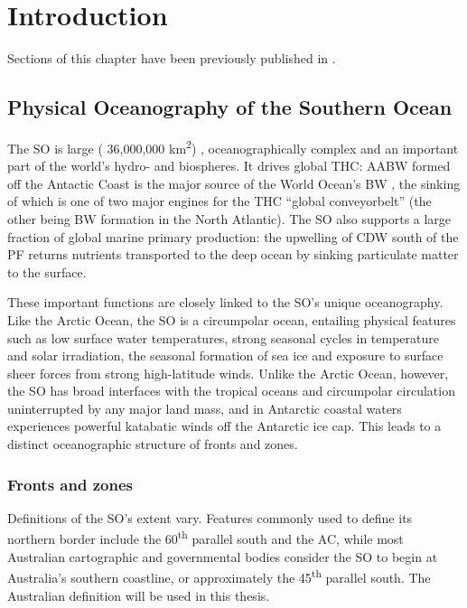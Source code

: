 \chapter{Introduction} 
\label{ch:intro}

Sections of this chapter have been previously published in .

\section{Physical Oceanography of the Southern Ocean}

The \ac{SO} is large (\textapprox{} 36,000,000 km\textsuperscript{2}) \cite{Laws:1985tx}, oceanographically complex and an important part of the world's hydro- and biospheres.
It drives global \ac{THC}: \ac{AABW} formed off the Antactic Coast is the major source of the World Ocean's \ac{BW} \cite{Jacobs:2004hv}, the sinking of which is one of two major engines for the \ac{THC} ``global conveyorbelt'' (the other being \ac{BW} formation in the North Atlantic).
The \ac{SO} also supports a large fraction of global marine primary production: the upwelling of \ac{CDW} south of the \ac{PF} returns nutrients transported to the deep ocean by sinking particulate matter \cite{Rath:1998wm} to the surface.

These important functions are closely linked to the \ac{SO}'s unique oceanography.
Like the Arctic Ocean, the \ac{SO} is a circumpolar ocean, entailing physical features such as low surface water temperatures, strong seasonal cycles in temperature and solar irradiation, the seasonal formation of sea ice and exposure to surface sheer forces from strong high-latitude winds.
Unlike the Arctic Ocean, however, the \ac{SO} has broad interfaces with the tropical oceans and circumpolar circulation uninterrupted by any major land mass, and in Antarctic coastal waters experiences powerful katabatic winds off the Antarctic ice cap.
This leads to a distinct oceanographic structure of fronts and zones.

\subsection{Fronts and zones}
Definitions of the \ac{SO}'s extent vary.
Features commonly used to define its northern border include the 60\textsuperscript{th} parallel south and the \ac{AC}, while most Australian cartographic and governmental bodies consider the \ac{SO} to begin at Australia's southern coastline, or approximately the 45\textsuperscript{th} parallel south.
The Australian definition will be used in this thesis.


